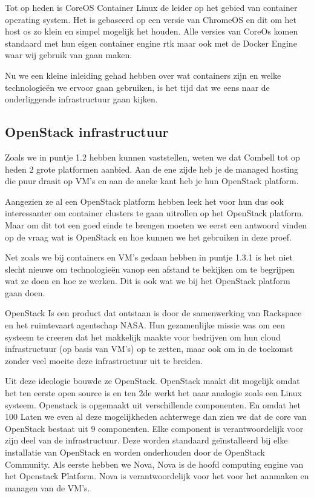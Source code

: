 Tot op heden is CoreOS Container Linux de leider op het gebied van container operating system. Het is gebaseerd op een versie van ChromeOS en dit om het host os zo klein en simpel mogelijk het houden. 
Alle versies van CoreOs komen standaard met hun eigen container engine rtk maar ook met de Docker Engine waar wij gebruik van gaan maken.

Nu we een kleine inleiding gehad hebben over wat containers zijn en welke technologieën we ervoor gaan gebruiken, is het tijd dat we eens naar de onderliggende infrastructuur gaan kijken.

\subsection{OpenStack infrastructuur}

Zoals we in puntje 1.2 hebben kunnen vaststellen, weten we dat Combell tot op heden 2 grote platformen aanbied. Aan de ene zijde heb je de managed hosting die puur draait op VM’s en aan de aneke kant heb je hun OpenStack platform. 

Aangezien ze al een OpenStack platform hebben leek het voor hun dus ook interessanter om container clusters te gaan uitrollen op het OpenStack platform. Maar om dit tot een goed einde te brengen moeten we eerst een antwoord vinden op de vraag wat is OpenStack en hoe kunnen we het gebruiken in deze proef.

Net zoals we bij containers en VM’s gedaan hebben in puntje 1.3.1 is het niet slecht nieuwe om technologieën vanop een afstand te bekijken om te begrijpen wat ze doen en hoe ze werken.
Dit is ook wat we bij het OpenStack platform gaan doen. 

OpenStack Is een product dat ontstaan is door de samenwerking van Rackspace en het ruimtevaart agentschap NASA. Hun gezamenlijke missie was om een systeem te creeren dat het makkelijk maakte voor bedrijven om hun cloud infrastructuur (op basis van VM’s) op te zetten, maar ook om in de toekomst zonder veel moeite deze infrastructuur uit te breiden. 

Uit deze ideologie bouwde ze OpenStack. OpenStack maakt dit mogelijk omdat het ten eerste open source is en ten 2de werkt het naar analogie zoals een Linux systeem. 
Openstack is opgemaakt uit verschillende componenten. En omdat het 100%
Laten we even al deze mogelijkheden achterwege dan zien we dat de core van OpenStack bestaat uit 9 componenten. Elke component is verantwoordelijk voor zijn deel van de infrastructuur. Deze worden standaard geïnstalleerd bij elke installatie van OpenStack en worden onderhouden door de OpenStack Community.
Als eerste hebben we Nova, Nova is de hoofd computing engine van het Openstack Platform. Nova is verantwoordelijk voor het voor het aanmaken en managen van de VM’s.

